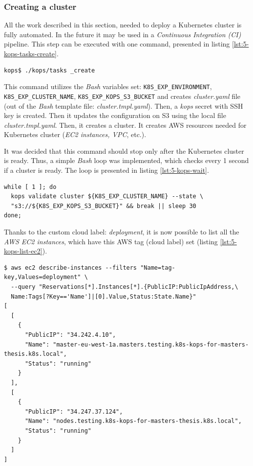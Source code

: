 \subsubsection{Creating a cluster}
\label{kops-creating-the-cluster}
All the work described in this section, needed to deploy a Kubernetes cluster is fully automated. In the future it may be used in a \textit{Continuous Integration (CI)} pipeline. This step can be executed with one command, presented in listing \ref{lst:5-kops-tasks-create}.
\begin{lstlisting}[basicstyle=\scriptsize,xleftmargin=0cm,label=lst:5-kops-tasks-create,caption={\textit{Bash} command automating cluster creation}]
kops$ ./kops/tasks _create
\end{lstlisting}

This command utilizes the \textit{Bash} variables set: \verb|K8S_EXP_ENVIRONMENT|, \\
\verb|K8S_EXP_CLUSTER_NAME|, \verb|K8S_EXP_KOPS_S3_BUCKET| and creates \textit{cluster.yaml} file (out of the \textit{Bash} template file: \textit{cluster.tmpl.yaml}). Then, a \textit{kops} secret with SSH key is created. Then it updates the configuration on S3 using the local file \textit{cluster.tmpl.yaml}. Then, it creates a cluster. It creates AWS resources needed for Kubernetes cluster (\textit{EC2 instances, VPC}, etc.).

It was decided that this command should stop only after the Kubernetes cluster is ready. Thus, a simple \textit{Bash} loop was implemented, which checks every 1 second if a cluster is ready. The loop is presented in listing \ref{lst:5-kops-wait}.
\begin{lstlisting}[basicstyle=\scriptsize,xleftmargin=0cm,label=lst:5-kops-wait,caption={A waiting mechanism that waits until a \textit{kops} cluster is ready}]
while [ 1 ]; do
  kops validate cluster ${K8S_EXP_CLUSTER_NAME} --state \
  "s3://${K8S_EXP_KOPS_S3_BUCKET}" && break || sleep 30
done;
\end{lstlisting}



Thanks to the custom cloud label: \textit{deployment}, it is now possible to list all the \textit{AWS EC2 instances}, which have this AWS tag (cloud label) set (listing \ref{lst:5-kops-list-ec2}).
\begin{lstlisting}[basicstyle=\scriptsize,xleftmargin=0cm,label=lst:5-kops-list-ec2,caption={Listing all \textit{AWS EC2 instancs} by AWS tag}]
$ aws ec2 describe-instances --filters "Name=tag-key,Values=deployment" \
  --query "Reservations[*].Instances[*].{PublicIP:PublicIpAddress,\
  Name:Tags[?Key=='Name']|[0].Value,Status:State.Name}"
[
  [
    {
      "PublicIP": "34.242.4.10",
      "Name": "master-eu-west-1a.masters.testing.k8s-kops-for-masters-thesis.k8s.local",
      "Status": "running"
    }
  ],
  [
    {
      "PublicIP": "34.247.37.124",
      "Name": "nodes.testing.k8s-kops-for-masters-thesis.k8s.local",
      "Status": "running"
    }
  ]
]
\end{lstlisting}


